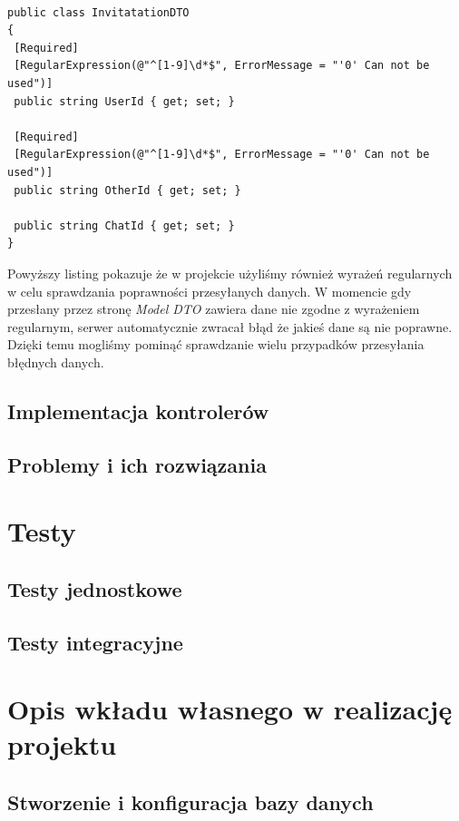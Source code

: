 \documentclass[12pt,a4paper]{article}
\begin{document}
\begin{lstlisting}[caption={Przykładowa klasa modelu DTO - Message}]

public class InvitatationDTO
{
 [Required]
 [RegularExpression(@"^[1-9]\d*$", ErrorMessage = "'0' Can not be used")]
 public string UserId { get; set; }
	
 [Required]
 [RegularExpression(@"^[1-9]\d*$", ErrorMessage = "'0' Can not be used")]
 public string OtherId { get; set; }
	
 public string ChatId { get; set; }
}
\end{lstlisting}

\hspace*{0.7cm} Powyższy listing pokazuje że w projekcie użyliśmy również wyrażeń regularnych w celu sprawdzania poprawności przesyłanych danych. W momencie gdy przesłany przez stronę \textit{Model DTO} zawiera dane nie zgodne z wyrażeniem regularnym, serwer automatycznie zwracał błąd że jakieś dane są nie poprawne. Dzięki temu mogliśmy pominąć sprawdzanie wielu przypadków przesyłania błędnych danych.


\subsection{Implementacja kontrolerów}		%
\subsection{Problemy i ich rozwiązania}		%

\section{Testy}

\subsection{Testy jednostkowe}   %
\subsection{Testy integracyjne}  %

\section{Opis wkładu własnego w realizację projektu}

\subsection{Stworzenie i konfiguracja bazy danych}
\end{document}
